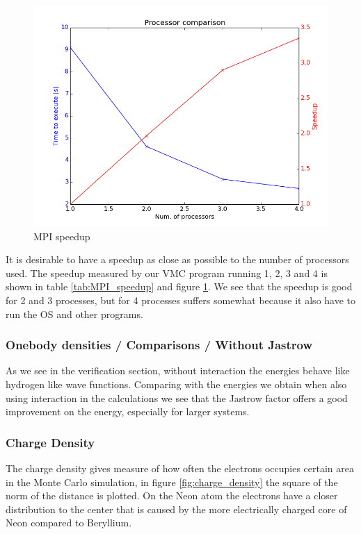 \documentclass[11pt]{article}
\begin{document}
			\begin{figure}
			\centering \includegraphics[width=0.45\linewidth]{../figures/processor_number_time_comparison}
			\protect\caption{MPI speedup}
			\label{fig:MPI_speedup}
			\end{figure}

			It is desirable to have a speedup as close as possible to the number of processors used. The speedup measured by our VMC program running 1, 2, 3 and 4 is shown in table \ref{tab:MPI_speedup} and figure \ref{fig:MPI_speedup}. We see that the speedup is good for 2 and 3 processes, but for 4 processes suffers somewhat because it also have to run the OS and other programs.

		\subsubsection{Onebody densities / Comparisons / Without Jastrow}
			As we see in the verification section, without interaction the energies behave like hydrogen like wave functions. Comparing with the energies we obtain when also using interaction in the calculations we see that the Jastrow factor offers a good improvement on the energy, especially for larger systems.

		\subsubsection{Charge Density}
			The charge density gives measure of how often the electrons occupies certain area in the Monte Carlo simulation, in figure \ref{fig:charge_density} the square of the norm of the distance is plotted.
			On the Neon atom the electrons have a closer distribution to the center that is caused by the more electrically charged core of Neon compared to Beryllium.
\end{document}

